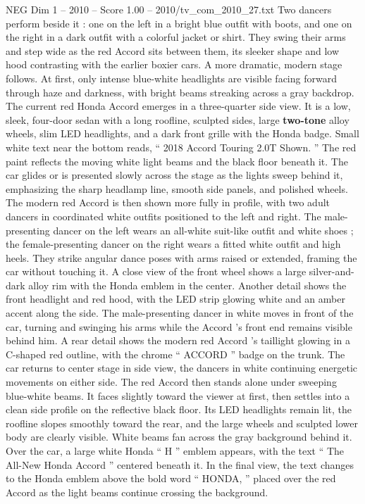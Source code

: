 \begin{textsample}{NEG Dim 1 – 2010 – Score 1.00 – 2010/tv\_com\_2010\_27.txt}
Two dancers perform beside it : one on the left in a bright blue outfit with boots, and one on the right in a dark outfit with a colorful jacket or shirt.
They swing their arms and step wide as the red Accord sits between them, its sleeker shape and low hood contrasting with the earlier boxier cars.
A more dramatic, modern stage follows.
At first, only intense blue-white headlights are visible facing forward through haze and darkness, with bright beams streaking across a gray backdrop.
The current red Honda Accord emerges in a three-quarter side view.
It is a low, sleek, four-door sedan with a long roofline, sculpted sides, large \textbf{two-tone} alloy wheels, slim LED headlights, and a dark front grille with the Honda badge.
Small white text near the bottom reads, “ 2018 Accord Touring 2.0T Shown. ” The red paint reflects the moving white light beams and the black floor beneath it.
The car glides or is presented slowly across the stage as the lights sweep behind it, emphasizing the sharp headlamp line, smooth side panels, and polished wheels.
The modern red Accord is then shown more fully in profile, with two adult dancers in coordinated white outfits positioned to the left and right.
The male-presenting dancer on the left wears an all-white suit-like outfit and white shoes ; the female-presenting dancer on the right wears a fitted white outfit and high heels.
They strike angular dance poses with arms raised or extended, framing the car without touching it.
A close view of the front wheel shows a large silver-and-dark alloy rim with the Honda emblem in the center.
Another detail shows the front headlight and red hood, with the LED strip glowing white and an amber accent along the side.
The male-presenting dancer in white moves in front of the car, turning and swinging his arms while the Accord ’s front end remains visible behind him.
A rear detail shows the modern red Accord ’s taillight glowing in a C-shaped red outline, with the chrome “ ACCORD ” badge on the trunk.
The car returns to center stage in side view, the dancers in white continuing energetic movements on either side.
The red Accord then stands alone under sweeping blue-white beams.
It faces slightly toward the viewer at first, then settles into a clean side profile on the reflective black floor.
Its LED headlights remain lit, the roofline slopes smoothly toward the rear, and the large wheels and sculpted lower body are clearly visible.
White beams fan across the gray background behind it.
Over the car, a large white Honda “ H ” emblem appears, with the text “ The All-New Honda Accord ” centered beneath it.
In the final view, the text changes to the Honda emblem above the bold word “ HONDA, ” placed over the red Accord as the light beams continue crossing the background.

\end{textsample}
